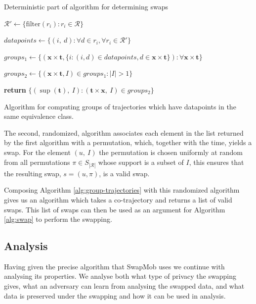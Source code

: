 \documentclass[12pt]{article}
\newcommand{\data}{d}
\newcommand{\traj}{r}
\newcommand{\cotraj}{\mathcal{R}}
\newcommand{\swap}{s}
\newcommand{\swaptime}{u}
\newcommand{\locint}{\mathbf{x}}
\newcommand{\timint}{\mathbf{t}}
\theoremstyle{definition}
\begin{document}
\begin{algorithm}
  \caption{Deterministic part of algorithm for determining swaps}
  \label{alg:group-trajectories}
  \begin{algorithmic}
    \Procedure{GroupTrajectories}{$\cotraj$} 

    \State
    \(\cotraj' \gets \{\textrm{filter}(\traj_{i}): \traj_{i} \in
    \cotraj\}\)

    \State
    \(datapoints \gets \{(i,\ \data): \forall \data \in \traj_{i},
    \forall \traj_{i} \in \cotraj'\}\)

    \State
    \(groups_{1} \gets \{(\locint \times \timint, \{i: (i, \data) \in
    datapoints, \data \in \locint \times \timint\}): \forall \locint
    \times \timint\}\)

    \State
    \(groups_{2} \gets \{(\locint \times \timint, I) \in groups_{1}:
    |I| > 1\}\)

    \State \textbf{return}
    \(\{(\sup(\timint),\ I): (\timint \times \locint,\ I) \in
    groups_{2}\}\)

    \EndProcedure
  \end{algorithmic}
  \caption{Algorithm for computing groups of trajectories which have
    datapoints in the same equivalence class.}
\end{algorithm}

The second, randomized, algorithm associates each element in the list
returned by the first algorithm with a permutation, which, together
with the time, yields a swap. For the element \((\swaptime,\ I)\) the
permutation is chosen uniformly at random from all permutations
\(\pi \in S_{|\cotraj|}\) whose support is a subset of \(I\), this
ensures that the resulting swap, \(\swap = (\swaptime, \pi)\), is a
valid swap.

Composing Algorithm \ref{alg:group-trajectories} with this randomized
algorithm gives us an algorithm which takes a co-trajectory and
returns a list of valid swaps. This list of swaps can then be used as
an argument for Algorithm \ref{alg:swap} to perform the swapping.

\subsection{Analysis}
\label{sec:swapmob-analysis}
Having given the precise algorithm that SwapMob uses we continue with
analysing its properties. We analyse both what type of privacy the
swapping gives, what an adversary can learn from analysing the swapped
data, and what data is preserved under the swapping and how it can be
used in analysis.
\end{document}
